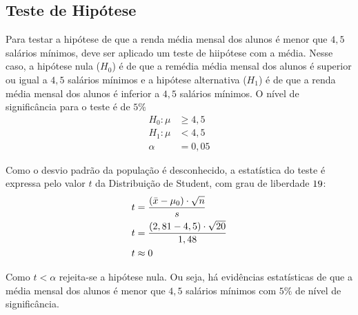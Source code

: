 

\subsection{Teste de Hipótese}

Para testar a hipótese de que a renda média mensal dos alunos é menor que $4,5$
salários mínimos, deve ser aplicado um teste de hiipótese com a média. Nesse
caso, a hipótese nula ($H_0$) é de que a remédia média mensal dos alunos é
superior ou igual a $4,5$ salários mínimos e a hipótese alternativa ($H_1$) é
de que a renda média mensal dos alunos é inferior a $4,5$ salários mínimos. O
nível de significância para o teste é de $5\%$
%
\begin{align*}
	H_0: \mu &\geq 4,5\\
	H_1: \mu &< 4,5   \\
	     \alpha &= 0,05
\end{align*}

Como o desvio padrão da população é desconhecido, a estatística do teste é
expressa pelo valor $t$ da Distribuição de Student, com grau de liberdade
$19$:
%
\begin{align*}
	t &= \frac{(\bar{x} - \mu_0)\cdot\sqrt{n}}{s} \\
	t &= \dfrac{(2,81 - 4,5) \cdot \sqrt{20}}{1,48} \\
	t &\approx 0
\end{align*}

Como $t < \alpha$ rejeita-se a hipótese nula. Ou seja, há evidências
estatísticas de que a média mensal dos alunos é menor que $4,5$ salários
mínimos com $5\%$ de nível de significância.
